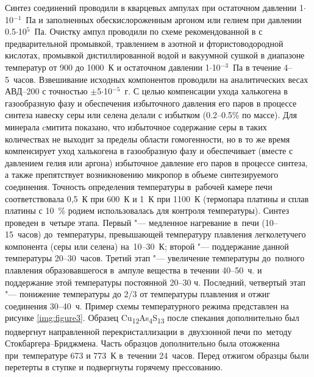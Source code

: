 Синтез соединений проводили в кварцевых ампулах при остаточном давлении 1$\cdot$10$^{-1}$~Па и заполненных обескислороженным аргоном или гелием при давлении 0.5$\cdot$10$^{5}$~Па. Очистку ампул проводили по схеме рекомендованной в \cite{156} с предварительной промывкой, травлением в азотной и фтористоводородной кислотах, промывкой дистиллированной водой и вакуумной сушкой в диапазоне температур от 900 до 1000~К и остаточном давлении 1$\cdot$10$^{-3}$~Па в течение 4--5~часов. Взвешивание исходных компонентов проводили на аналитических весах АВД--200 с точностью $\pm$5$\cdot$10$^{-5}$~г.
С целью компенсации ухода халькогена в газообразную фазу и обеспечения избыточного давления его паров в процессе синтеза навеску серы или селена делали с избытком (0.2--0.5\% по массе).
Для минерала cмитита показано\cite{181}, что избыточное содержание серы в таких количествах не выходит за пределы области гомогенности, но в то же время компенсирует уход халькогена в газообразную фазу и обеспечивает (вместе с давлением гелия или аргона) избыточное давление его паров в процессе синтеза, а также препятствует возникновению микропор в объеме синтезируемого соединения.
Точность определения температуры в~рабочей камере печи соответствовала 0,5~К при 600~К и 1~К при 1100~К (термопара платины и сплав платины с 10~\% родием использовалась для контроля температуры). Синтез проведен в~четыре этапа. Первый "--- медленное нагревание в~печи (10--15~часов) до~температуры, превышающей температуру плавления легколетучего компонента (серы или селена) на~10--30~К; второй "--- поддержание данной температуры 20--30~часов. Третий этап "--- увеличение температуры до~полного плавления образовавшегося в~ампуле вещества в течении 40--50~ч. и поддержание этой температуры постоянной 20--30 ч. Последний, четвертый этап  "--- понижение температуры до 2/3 от температуры плавления и отжиг соединения 30--40~ч.
 Пример схемы температурного режима представлен на рисунке \ref{img:figure3}. Образец Cu\textsubscript{12}As\textsubscript{4}S\textsubscript{13} после спекания дополнительно был подвергнут направленной перекристаллизации в~двухзонной печи по~методу Стокбаргера--Бриджмена. Часть образцов дополнительно была отожженна при~температуре 673 и 773~К в~течении 24~часов.
Перед отжигом образцы были перетерты в ступке и подвергнуты горячему прессованию.

\newpage
